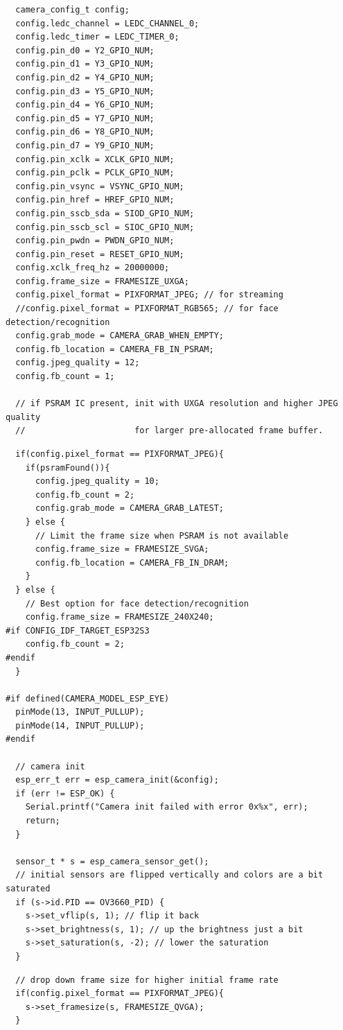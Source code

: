\documentclass{report}
\begin{document}
\begin{enumerate}
\begin{itemize}
\begin{lstlisting}
  camera_config_t config;
  config.ledc_channel = LEDC_CHANNEL_0;
  config.ledc_timer = LEDC_TIMER_0;
  config.pin_d0 = Y2_GPIO_NUM;
  config.pin_d1 = Y3_GPIO_NUM;
  config.pin_d2 = Y4_GPIO_NUM;
  config.pin_d3 = Y5_GPIO_NUM;
  config.pin_d4 = Y6_GPIO_NUM;
  config.pin_d5 = Y7_GPIO_NUM;
  config.pin_d6 = Y8_GPIO_NUM;
  config.pin_d7 = Y9_GPIO_NUM;
  config.pin_xclk = XCLK_GPIO_NUM;
  config.pin_pclk = PCLK_GPIO_NUM;
  config.pin_vsync = VSYNC_GPIO_NUM;
  config.pin_href = HREF_GPIO_NUM;
  config.pin_sscb_sda = SIOD_GPIO_NUM;
  config.pin_sscb_scl = SIOC_GPIO_NUM;
  config.pin_pwdn = PWDN_GPIO_NUM;
  config.pin_reset = RESET_GPIO_NUM;
  config.xclk_freq_hz = 20000000;
  config.frame_size = FRAMESIZE_UXGA;
  config.pixel_format = PIXFORMAT_JPEG; // for streaming
  //config.pixel_format = PIXFORMAT_RGB565; // for face detection/recognition
  config.grab_mode = CAMERA_GRAB_WHEN_EMPTY;
  config.fb_location = CAMERA_FB_IN_PSRAM;
  config.jpeg_quality = 12;
  config.fb_count = 1;
  
  // if PSRAM IC present, init with UXGA resolution and higher JPEG quality
  //                      for larger pre-allocated frame buffer.
  \end{lstlisting}
  \vspace*{1cm}
  \begin{lstlisting}
  if(config.pixel_format == PIXFORMAT_JPEG){
    if(psramFound()){
      config.jpeg_quality = 10;
      config.fb_count = 2;
      config.grab_mode = CAMERA_GRAB_LATEST;
    } else {
      // Limit the frame size when PSRAM is not available
      config.frame_size = FRAMESIZE_SVGA;
      config.fb_location = CAMERA_FB_IN_DRAM;
    }
  } else {
    // Best option for face detection/recognition
    config.frame_size = FRAMESIZE_240X240;
#if CONFIG_IDF_TARGET_ESP32S3
    config.fb_count = 2;
#endif
  }

#if defined(CAMERA_MODEL_ESP_EYE)
  pinMode(13, INPUT_PULLUP);
  pinMode(14, INPUT_PULLUP);
#endif

  // camera init
  esp_err_t err = esp_camera_init(&config);
  if (err != ESP_OK) {
    Serial.printf("Camera init failed with error 0x%x", err);
    return;
  }

  sensor_t * s = esp_camera_sensor_get();
  // initial sensors are flipped vertically and colors are a bit saturated
  if (s->id.PID == OV3660_PID) {
    s->set_vflip(s, 1); // flip it back
    s->set_brightness(s, 1); // up the brightness just a bit
    s->set_saturation(s, -2); // lower the saturation
  }
  \end{lstlisting}
  \vspace*{1cm}
  \begin{lstlisting}
  // drop down frame size for higher initial frame rate
  if(config.pixel_format == PIXFORMAT_JPEG){
    s->set_framesize(s, FRAMESIZE_QVGA);
  }


\end{lstlisting}
\end{itemize}
\end{enumerate}
\end{document}
